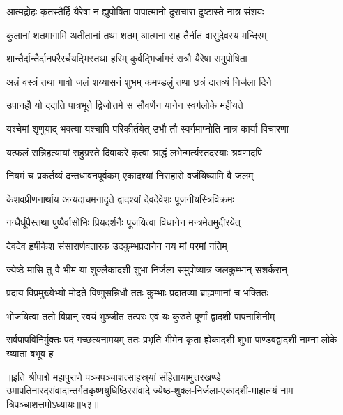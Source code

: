 \twolineshloka
{आत्मद्रोहः कृतस्तैर्हि यैरेषा न ह्युपोषिता}
{पापात्मानो दुराचारा दुष्टास्ते नात्र संशयः}%

\twolineshloka
{कुलानां शतमागामि अतीतानां तथा शतम्}
{आत्मना सह तैर्नीतं वासुदेवस्य मन्दिरम्}%

\twolineshloka
{शान्तैर्दान्तैर्दानपरैरर्चयद्भिस्तथा हरिम्}
{कुर्वद्भिर्जागरं रात्रौ यैरेषा समुपोषिता}%

\twolineshloka
{अन्नं वस्त्रं तथा गावो जलं शय्यासनं शुभम्}
{कमण्डलुं तथा छत्रं दातव्यं निर्जला दिने}%

\twolineshloka
{उपानहौ यो ददाति पात्रभूते द्विजोत्तमे}
{स सौवर्णेन यानेन स्वर्गलोके महीयते}%

\twolineshloka
{यश्चेमां शृणुयाद् भक्त्या यश्चापि परिकीर्तयेत्}
{उभौ तौ स्वर्गमाप्नोति नात्र कार्या विचारणा}%

\twolineshloka
{यत्फलं सन्निहत्यायां राहुग्रस्ते दिवाकरे}
{कृत्वा श्राद्धं लभेन्मर्त्यस्तदस्याः श्रवणादपि}%

\twolineshloka
{नियमं च प्रकर्तव्यं दन्तधावनपूर्वकम्}
{एकादश्यां निराहारो वर्जयिष्यामि वै जलम्}%

\twolineshloka
{केशवप्रीणनार्थाय अन्यदाचमनादृते}
{द्वादश्यां देवदेवेशः पूजनीयस्त्रिविक्रमः}%

\twolineshloka
{गन्धैर्धूपैस्तथा पुष्पैर्वासोभिः प्रियदर्शनैः}
{पूजयित्वा विधानेन मन्त्रमेतमुदीरयेत्}%

\twolineshloka
{देवदेव हृषीकेश संसारार्णवतारक}
{उदकुम्भप्रदानेन नय मां परमां गतिम्}%

\twolineshloka
{ज्येष्ठे मासि तु वै भीम या शुक्लैकादशी शुभा}
{निर्जला समुपोष्यात्र जलकुम्भान् सशर्करान्}%

\twolineshloka
{प्रदाय विप्रमुख्येभ्यो मोदते विष्णुसन्निधौ}
{ततः कुम्भाः प्रदातव्या ब्राह्मणानां  च भक्तितः}%

\twolineshloka
{भोजयित्वा ततो विप्रान् स्वयं भुञ्जीत तत्परः}
{एवं यः कुरुते पूर्णां द्वादशीं पापनाशिनीम्}%

\threelineshloka
{सर्वपापविनिर्मुक्तः पदं गच्छत्यनामयम्}
{ततः प्रभृति भीमेन कृता ह्येकादशी शुभा}
{पाण्डवद्वादशी नाम्ना लोके ख्याता बभूव ह}%

॥इति श्रीपाद्मे महापुराणे पञ्चपञ्चाशत्साहस्र्यां संहितायामुत्तरखण्डे उमापतिनारदसंवादान्तर्गतकृष्णयुधिष्ठिरसंवादे ज्येष्ठ-शुक्ल-निर्जला-एकादशी-माहात्म्यं नाम त्रिपञ्चाशत्तमोऽध्यायः॥५३॥

\genMangalaShloka

\hyperref[sec:ekadashi_mahatmyam_padma_puranam]{\closesub}
\clearpage

